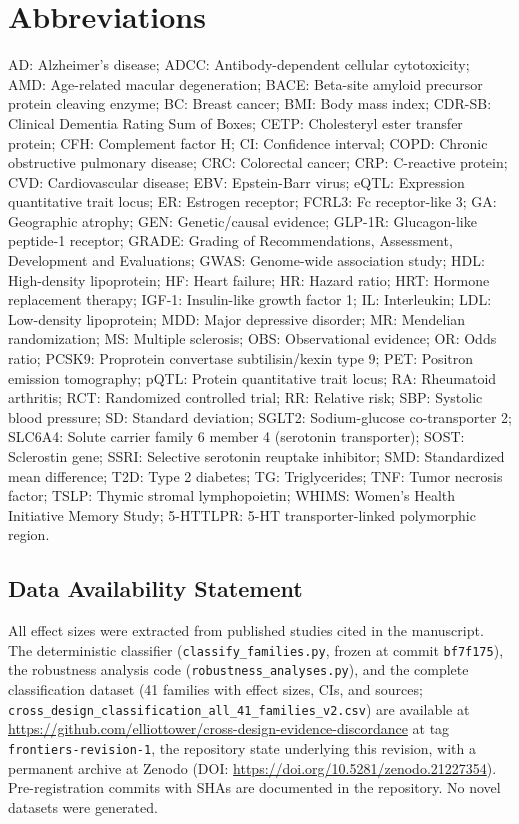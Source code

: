 \documentclass[11pt]{article}
\begin{document}
\section*{Abbreviations}
AD: Alzheimer's disease;
ADCC: Antibody-dependent cellular cytotoxicity;
AMD: Age-related macular degeneration;
BACE: Beta-site amyloid precursor protein cleaving enzyme;
BC: Breast cancer;
BMI: Body mass index;
CDR-SB: Clinical Dementia Rating Sum of Boxes;
CETP: Cholesteryl ester transfer protein;
CFH: Complement factor H;
CI: Confidence interval;
COPD: Chronic obstructive pulmonary disease;
CRC: Colorectal cancer;
CRP: C-reactive protein;
CVD: Cardiovascular disease;
EBV: Epstein-Barr virus;
eQTL: Expression quantitative trait locus;
ER: Estrogen receptor;
FCRL3: Fc receptor-like 3;
GA: Geographic atrophy;
GEN: Genetic/causal evidence;
GLP-1R: Glucagon-like peptide-1 receptor;
GRADE: Grading of Recommendations, Assessment, Development and Evaluations;
GWAS: Genome-wide association study;
HDL: High-density lipoprotein;
HF: Heart failure;
HR: Hazard ratio;
HRT: Hormone replacement therapy;
IGF-1: Insulin-like growth factor 1;
IL: Interleukin;
LDL: Low-density lipoprotein;
MDD: Major depressive disorder;
MR: Mendelian randomization;
MS: Multiple sclerosis;
OBS: Observational evidence;
OR: Odds ratio;
PCSK9: Proprotein convertase subtilisin/kexin type 9;
PET: Positron emission tomography;
pQTL: Protein quantitative trait locus;
RA: Rheumatoid arthritis;
RCT: Randomized controlled trial;
RR: Relative risk;
SBP: Systolic blood pressure;
SD: Standard deviation;
SGLT2: Sodium-glucose co-transporter 2;
SLC6A4: Solute carrier family 6 member 4 (serotonin transporter);
SOST: Sclerostin gene;
SSRI: Selective serotonin reuptake inhibitor;
SMD: Standardized mean difference;
T2D: Type 2 diabetes;
TG: Triglycerides;
TNF: Tumor necrosis factor;
TSLP: Thymic stromal lymphopoietin;
WHIMS: Women's Health Initiative Memory Study;
5-HTTLPR: 5-HT transporter-linked polymorphic region.

\subsection*{Data Availability Statement}
All effect sizes were extracted from published studies cited in the manuscript. The deterministic classifier (\texttt{classify\_families.py}, frozen at commit \texttt{bf7f175}), the robustness analysis code (\texttt{robustness\_analyses.py}), and the complete classification dataset (41 families with effect sizes, CIs, and sources; \texttt{cross\_design\_classification\_all\_41\_families\_v2.csv}) are available at \url{https://github.com/elliottower/cross-design-evidence-discordance} at tag \texttt{frontiers-revision-1}, the repository state underlying this revision, with a permanent archive at Zenodo (DOI: \url{https://doi.org/10.5281/zenodo.21227354}). Pre-registration commits with SHAs are documented in the repository. No novel datasets were generated.
\end{document}
